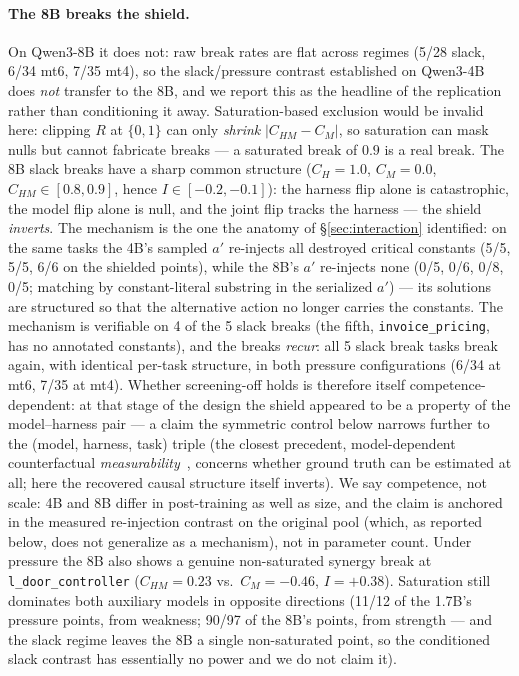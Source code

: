 \documentclass{article}
\theoremstyle{remark}
\begin{document}
\paragraph{The 8B breaks the shield.} On Qwen3-8B it does not: raw break
rates are flat across
regimes (5/28 slack, 6/34 mt6, 7/35 mt4), so the slack/pressure contrast
established on Qwen3-4B does \emph{not} transfer to the 8B, and we report
this as the headline of the replication rather than conditioning it away.
Saturation-based exclusion would be invalid here: clipping $R$ at $\{0,1\}$
can only \emph{shrink} $|C_{HM}-C_M|$, so saturation can mask nulls but
cannot fabricate breaks --- a saturated break of $0.9$ is a real break. The
8B slack breaks have a sharp common structure ($C_H = 1.0$, $C_M = 0.0$,
$C_{HM} \in [0.8, 0.9]$, hence $I \in [-0.2, -0.1]$): the harness flip alone is
catastrophic, the model flip alone is null, and the joint flip tracks the
harness --- the shield \emph{inverts}. The mechanism is the one the anatomy
of \S\ref{sec:interaction} identified: on the same tasks the 4B's sampled $a'$
re-injects all destroyed critical constants (5/5, 5/5, 6/6 on the shielded
points), while the 8B's $a'$ re-injects none (0/5, 0/6, 0/8, 0/5; matching
by constant-literal substring in the serialized $a'$) --- its
solutions are structured so that the alternative action no longer carries
the constants. The mechanism is verifiable on 4 of the 5 slack breaks (the
fifth, \texttt{invoice\_pricing}, has no annotated constants), and the
breaks \emph{recur}: all 5 slack break tasks break again, with identical
per-task structure, in both pressure configurations (6/34 at mt6, 7/35 at
mt4). Whether screening-off holds is therefore itself
competence-dependent: at that stage of the design the shield appeared to be
a property of the model--harness pair --- a claim the symmetric control
below narrows further to the (model, harness, task) triple
(the closest precedent, model-dependent counterfactual
\emph{measurability}~\citep{audit2026}, concerns whether ground truth can be
estimated at all; here the recovered causal structure itself inverts). We
say competence, not scale: 4B and 8B differ in post-training as well as
size, and the claim is anchored in the measured re-injection contrast on
the original pool (which, as reported below, does not generalize as a
mechanism), not in parameter count.
Under pressure the 8B also shows a genuine non-saturated synergy break at
\texttt{l\_door\_controller} ($C_{HM}=0.23$ vs.\ $C_M=-0.46$, $I=+0.38$).
Saturation still dominates both auxiliary models in opposite directions
(11/12 of the 1.7B's pressure points, from weakness; 90/97 of the 8B's
points, from strength --- and the slack regime leaves the 8B a single
non-saturated point, so the conditioned slack contrast has essentially no
power and we do not claim it).
\end{document}

